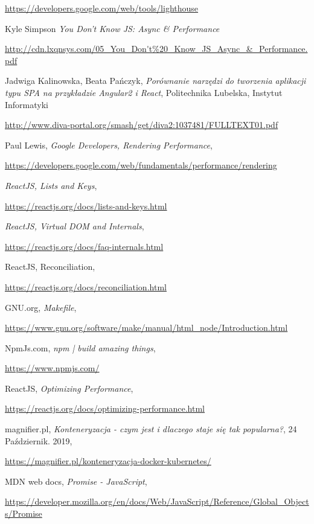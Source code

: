 \begin{thebibliography}{99}
\url{https://developers.google.com/web/tools/lighthouse}

Kyle Simpson
\emph{You Don't Know JS: Async \& Performance}

\url{http://cdn.lxqnsys.com/05_You_Don't\%20_Know_JS_Async_\&_Performance.pdf}

Jadwiga Kalinowska, Beata Pańczyk,
\emph{Porównanie narzędzi do tworzenia aplikacji typu SPA na przykładzie Angular2 i React},
Politechnika Lubelska, Instytut Informatyki

\url{http://www.diva-portal.org/smash/get/diva2:1037481/FULLTEXT01.pdf}

Paul Lewis,
\emph{Google Developers, Rendering Performance},

\url{https://developers.google.com/web/fundamentals/performance/rendering}

 \emph{ReactJS,  Lists and Keys},

\url{https://reactjs.org/docs/lists-and-keys.html}

\emph{ReactJS, Virtual DOM and Internals}, 

\url{https://reactjs.org/docs/faq-internals.html}

ReactJS, Reconciliation,

\url{https://reactjs.org/docs/reconciliation.html}

GNU.org, 
\emph{Makefile},

\url{https://www.gnu.org/software/make/manual/html_node/Introduction.html}

 NpmJs.com,
\emph{npm | build amazing things},

\url{https://www.npmjs.com/}

 ReactJS,
\emph{Optimizing Performance},

\url{https://reactjs.org/docs/optimizing-performance.html}

magnifier.pl,
\emph{Konteneryzacja - czym jest i dlaczego staje się tak popularna?},
24 Październik. 2019,

\url{https://magnifier.pl/konteneryzacja-docker-kubernetes/}

MDN web docs,
\emph{Promise - JavaScript},

\url{https://developer.mozilla.org/en/docs/Web/JavaScript/Reference/Global_Objects/Promise}


\end{thebibliography}
